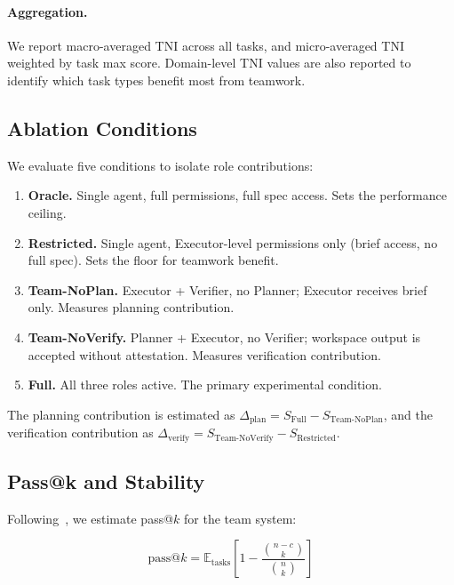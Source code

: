 \documentclass{article}
\newcommand{\tni}{\textsc{TNI}}
\begin{document}
\paragraph{Aggregation.}
We report macro-averaged \tni{} across all tasks, and micro-averaged \tni{}
weighted by task max score. Domain-level \tni{} values are also reported to
identify which task types benefit most from teamwork.

\subsection{Ablation Conditions}
\label{sec:metrics:ablation}

We evaluate five conditions to isolate role contributions:

\begin{enumerate}
  \item \textbf{Oracle.} Single agent, full permissions, full spec access.
        Sets the performance ceiling.
  \item \textbf{Restricted.} Single agent, Executor-level permissions only
        (brief access, no full spec). Sets the floor for teamwork benefit.
  \item \textbf{Team-NoPlan.} Executor + Verifier, no Planner; Executor
        receives brief only. Measures planning contribution.
  \item \textbf{Team-NoVerify.} Planner + Executor, no Verifier; workspace
        output is accepted without attestation. Measures verification
        contribution.
  \item \textbf{Full.} All three roles active. The primary experimental
        condition.
\end{enumerate}

The planning contribution is estimated as
$\Delta_{\text{plan}} = S_{\text{Full}} - S_{\text{Team-NoPlan}}$,
and the verification contribution as
$\Delta_{\text{verify}} = S_{\text{Team-NoVerify}} - S_{\text{Restricted}}$.

\subsection{Pass@k and Stability}
\label{sec:metrics:passk}

Following~\cite{chen2021codex}, we estimate pass@$k$ for the team system:

\begin{equation}
  \text{pass@}k = \mathbb{E}_{\text{tasks}}\!\left[
    1 - \frac{\binom{n-c}{k}}{\binom{n}{k}}
  \right]
\end{equation}
\end{document}
